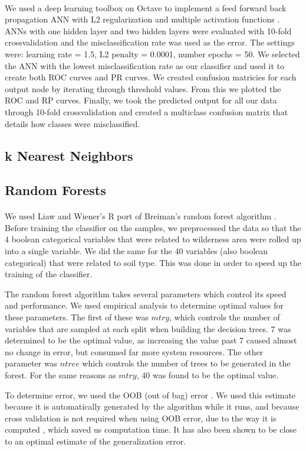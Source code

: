 \documentclass[11pt]{article}
\begin{document}
\paragraph{}
We used a deep learning toolbox on Octave to implement a feed forward back propagation ANN with L2 regularization and multiple activation functions \cite{rbp12}.  ANNs with one hidden layer and two hidden layers were evaluated with 10-fold crossvalidation and the misclassification rate was used as the error. The settings were: learning rate = 1.5, L2 penalty = 0.0001, number epochs = 50. We selected the ANN with the lowest misclassification rate as our classifier and used it to create both ROC curves and PR curves.  We created confusion matricies for each output node by iterating through threshold values.  From this we plotted the ROC and RP curves.  Finally, we took the predicted output for all our data through 10-fold crossvalidation and created a multiclass confusion matrix that details how classes were misclassified.

\subsection{k Nearest Neighbors}
\subsection{Random Forests}
\paragraph{}
We used Liaw and Wiener's R port \cite{liaw02} of Breiman's random forest algorithm \cite{breiman01}. Before training the classifier on the samples, we preprocessed the data so that the 4 boolean categorical variables that were related to wilderness area were rolled up into a single variable. We did the same for the 40 variables (also boolean categorical) that were related to soil type. This was done in order to speed up the training of the classifier.
\par
The random forest algorithm takes several parameters which control its speed and performance. We used empirical analysis to determine optimal values for these parameters. The first of these was $mtry$, which controls the number of variables that are sampled at each split when building the decision trees. 7 was determined to be the optimal value, as increasing the value past 7 caused almost no change in error, but consumed far more system resources. The other parameter was $ntree$ which controls the number of trees to be generated in the forest. For the same reasons as $mtry$, 40 was found to be the optimal value.
\par
To determine error, we used the OOB (out of bag) error \cite{breiman96}. We used this estimate because it is automatically generated by the algorithm while it runs, and because cross validation is not required when using OOB error, due to the way it is computed \cite{breiman01, breiman96}, which saved us computation time. It has also been shown to be close to an optimal estimate of the generalization error\cite{breiman96}.
\end{document}
